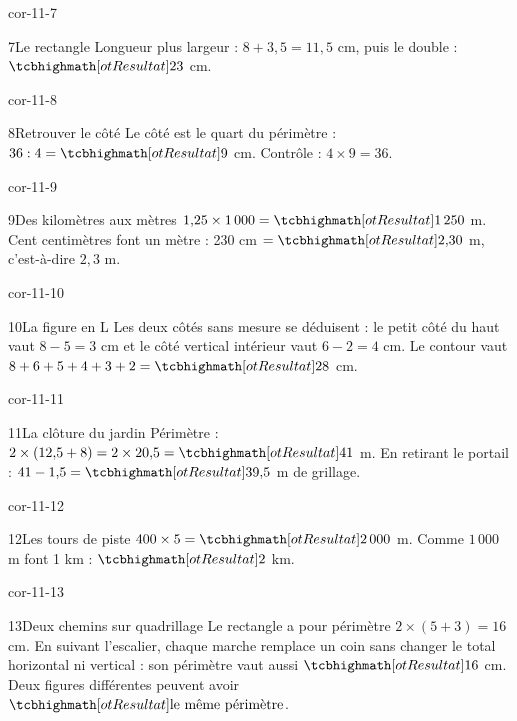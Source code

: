 \begin{blocLivre}{cor-11-7}\begin{corrige}{7}{Le rectangle}
Longueur plus largeur : $8+3{,}5=11{,}5$ cm, puis le double : $\res{23}$ cm.
\label{fig-cor-11-7}
\end{corrige}\end{blocLivre}
\begin{blocLivre}{cor-11-8}\begin{corrige}{8}{Retrouver le côté}
Le côté est le quart du périmètre : $36:4=\res9$ cm. Contrôle : $4\times9=36$.
\end{corrige}\end{blocLivre}
\begin{blocLivre}{cor-11-9}\begin{corrige}{9}{Des kilomètres aux mètres}
$1{,}25\times1\,000=\res{1\,250}$ m. Cent centimètres font un mètre : 230 cm $=\res{2{,}30}$ m, c’est-à-dire $2{,}3$ m.
\end{corrige}\end{blocLivre}
\begin{blocLivre}{cor-11-10}\begin{corrige}{10}{La figure en L}
Les deux côtés sans mesure se déduisent : le petit côté du haut vaut $8-5=3$ cm et le côté vertical intérieur vaut $6-2=4$ cm. Le contour vaut $8+6+5+4+3+2=\res{28}$ cm.
\label{fig-cor-11-10}
\end{corrige}\end{blocLivre}
\begin{blocLivre}{cor-11-11}\begin{corrige}{11}{La clôture du jardin}
Périmètre : $2\times(12{,}5+8)=2\times20{,}5=\res{41}$ m. En retirant le portail : $41-1{,}5=\res{39{,}5}$ m de grillage.
\end{corrige}\end{blocLivre}
\begin{blocLivre}{cor-11-12}\begin{corrige}{12}{Les tours de piste}
$400\times5=\res{2\,000}$ m. Comme $1\,000$ m font 1 km : $\res2$ km.
\end{corrige}\end{blocLivre}
\begin{blocLivre}{cor-11-13}\begin{corrige}{13}{Deux chemins sur quadrillage}
Le rectangle a pour périmètre $2\times(5+3)=16$ cm. En suivant l’escalier, chaque marche remplace un coin sans changer le total horizontal ni vertical : son périmètre vaut aussi $\res{16}$ cm. Deux figures différentes peuvent avoir $\res{\text{le même périmètre}}$.
\label{fig-cor-11-13}
\end{corrige}\end{blocLivre}
